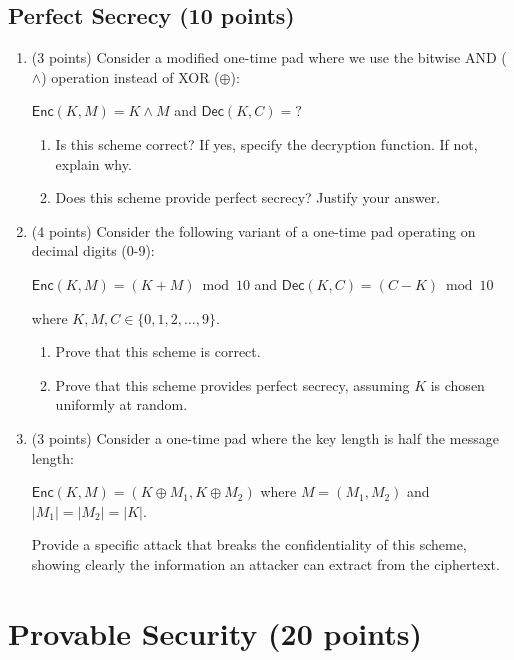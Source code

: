 \documentclass[10pt,a4paper,american]{article}
\begin{document}
\subsection{Perfect Secrecy (10 points)}

\begin{enumerate}
	\item (3 points) Consider a modified one-time pad where we use the bitwise AND ($\land$) operation instead of XOR ($\oplus$):

	      $\textsf{Enc}(K, M) = K \land M$ and $\textsf{Dec}(K, C) = ?$

	      \begin{enumerate}
		      \item Is this scheme correct? If yes, specify the decryption function. If not, explain why.
		      \item Does this scheme provide perfect secrecy? Justify your answer.
	      \end{enumerate}

	\item (4 points) Consider the following variant of a one-time pad operating on decimal digits (0-9):

	      $\textsf{Enc}(K, M) = (K + M) \bmod 10$ and $\textsf{Dec}(K, C) = (C - K) \bmod 10$

	      where $K, M, C \in \{0, 1, 2, \ldots, 9\}$.

	      \begin{enumerate}
		      \item Prove that this scheme is correct.
		      \item Prove that this scheme provides perfect secrecy, assuming $K$ is chosen uniformly at random.
	      \end{enumerate}

	\item (3 points) Consider a one-time pad where the key length is half the message length:

	      $\textsf{Enc}(K, M) = (K \oplus M_1, K \oplus M_2)$ where $M = (M_1, M_2)$ and $|M_1| = |M_2| = |K|$.

	      Provide a specific attack that breaks the confidentiality of this scheme, showing clearly the information an attacker can extract from the ciphertext.
\end{enumerate}

\section{Provable Security (20 points)}
\end{document}
